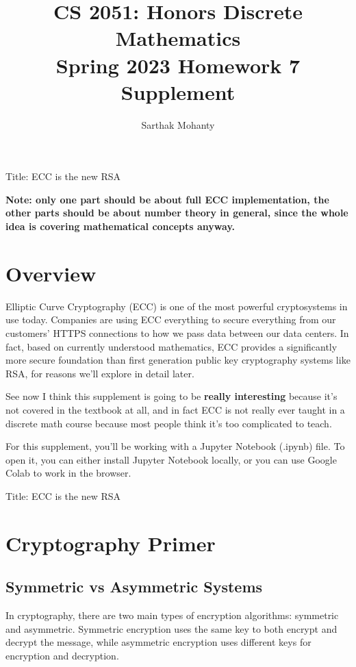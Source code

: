 \documentclass{article}
\title{\vspace{-1cm}CS 2051: Honors Discrete Mathematics \\Spring 2023 Homework 7 Supplement}
\author{Sarthak Mohanty }
\date{}
\begin{document}
\maketitle


Title: ECC is the new RSA

\textbf{Note: only one part should be about full ECC implementation, the other parts should be about number theory in general, since the whole idea is covering mathematical concepts anyway.}

\section*{Overview}

Elliptic Curve Cryptography (ECC) is one of the most powerful cryptosystems in use today. Companies are using ECC everything to secure everything from our customers' HTTPS connections to how we pass data between our data centers. In fact, based on currently understood mathematics, ECC provides a significantly more secure foundation than first generation public key cryptography systems like RSA, for reasons we'll explore in detail later.

\vspace{2mm}
See now I think this supplement is going to be \textbf{really interesting} because it's not covered in the textbook at all, and in fact ECC is not really ever taught in a discrete math course because most people think it's too complicated to teach.

\vspace{2mm}
For this supplement, you'll be working with a Jupyter Notebook (.ipynb) file. To open it, you can either install Jupyter Notebook locally, or you can use Google Colab to work in the browser.


Title: ECC is the new RSA


\section*{Cryptography Primer}


\subsection*{Symmetric vs Asymmetric Systems}

In cryptography, there are two main types of encryption algorithms: symmetric and asymmetric. Symmetric encryption uses the same key to both encrypt and decrypt the message, while asymmetric encryption uses different keys for encryption and decryption.
\end{document}
